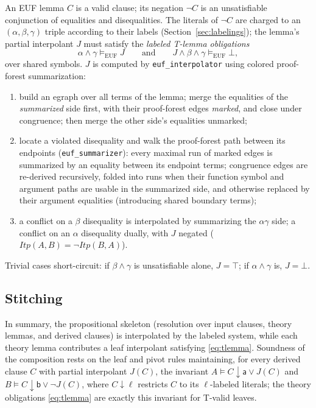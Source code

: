 \documentclass[11pt]{article}
\newcommand{\Itp}{\mathit{Itp}}
\newcommand{\true}{\top}
\newcommand{\false}{\bot}
\newcommand{\lbla}{\mathsf{a}}
\newcommand{\lblb}{\mathsf{b}}
\newcommand{\code}[1]{\texttt{#1}}
\begin{document}
An EUF lemma $C$ is a valid clause; its negation $\neg C$ is an
unsatisfiable conjunction of equalities and disequalities. The literals of
$\neg C$ are charged to an $(\alpha, \beta, \gamma)$ triple according to
their labels (Section~\ref{sec:labelings}); the lemma's partial interpolant
$J$ must satisfy the \emph{labeled T-lemma obligations}
\begin{equation}
\label{eq:tlemma}
\alpha \wedge \gamma \models_{\mathrm{EUF}} J
\qquad\text{and}\qquad
J \wedge \beta \wedge \gamma \models_{\mathrm{EUF}} \false ,
\end{equation}
over shared symbols. $J$ is computed by \code{euf\_interpolator} using
colored proof-forest summarization:
\begin{enumerate}
\item build an egraph over all terms of the lemma; merge the equalities of
      the \emph{summarized} side first, with their proof-forest edges
      \emph{marked}, and close under congruence; then merge the other
      side's equalities unmarked;
\item locate a violated disequality and walk the proof-forest path between
      its endpoints (\code{euf\_summarizer}): every maximal run of marked
      edges is summarized by an equality between its endpoint terms;
      congruence edges are re-derived recursively, folded into runs when
      their function symbol and argument paths are usable in the
      summarized side, and otherwise replaced by their argument equalities
      (introducing shared boundary terms);
\item a conflict on a $\beta$ disequality is interpolated by summarizing
      the $\alpha\gamma$ side; a conflict on an $\alpha$ disequality
      dually, with $J$ negated ($\Itp(A,B) = \neg \Itp(B,A)$).
\end{enumerate}
Trivial cases short-circuit: if $\beta \wedge \gamma$ is unsatisfiable
alone, $J = \true$; if $\alpha \wedge \gamma$ is, $J = \false$.

\subsection{Stitching}

In summary, the propositional skeleton (resolution over input clauses,
theory lemmas, and derived clauses) is interpolated by the labeled system,
while each theory lemma contributes a leaf interpolant satisfying
\eqref{eq:tlemma}. Soundness of the composition rests on the leaf and pivot
rules maintaining, for every derived clause $C$ with partial interpolant
$J(C)$, the invariant
$A \models C{\downarrow}\lbla \vee J(C)$ and
$B \models C{\downarrow}\lblb \vee \neg J(C)$,
where $C{\downarrow}\ell$ restricts $C$ to its $\ell$-labeled literals; the
theory obligations \eqref{eq:tlemma} are exactly this invariant for T-valid
leaves.
\end{document}
